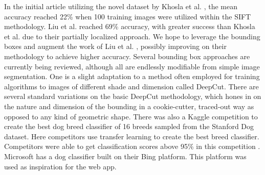 \documentclass[12pt]{article}
\begin{document}
In the initial article utilizing the novel dataset by Khosla et al. \cite{khosla2011novel}, the mean accuracy reached 22\% when 100 training images were utilized within the SIFT methodology. Liu et al. \cite{liu2012dog} reached 69\% accuracy, with greater success than Khosla et al. \cite{khosla2011novel} due to their partially localized approach. We hope to leverage the bounding boxes and augment the work of Liu et al. \cite{liu2012dog}, possibly improving on their methodology to achieve higher accuracy. Several bounding box approaches are currently being reviewed, although all are endlessly modifiable from simple image segmentation. One is a slight adaptation to a method often employed for training algorithms to images of different shade and dimension called DeepCut. \cite{rajchl2016deepcut} There are several standard variations on the basic DeepCut methodology, which hones in on the nature and dimension of the bounding in a cookie-cutter, traced-out way as opposed to any kind of geometric shape. There was also a Kaggle competition to create the best dog breed classifier of 16 breeds sampled from the Stanford Dog dataset. Here competitors use transfer learning to create the best breed classifier. Competitors were able to get classification scores above 95\% in this competition \cite{kaggledogs}. Microsoft has a dog classifier built on their Bing platform. This platform was used as inspiration for the web app.


\end{document}
